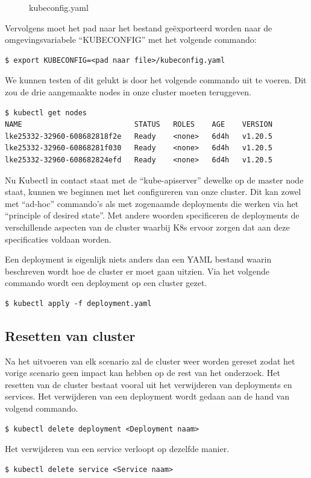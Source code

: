 \begin{figure}[h] 
	\inputminted[fontsize=\footnotesize,linenos]{yaml}{files/BachTest-kubeconfig.yaml}
	\caption{kubeconfig.yaml}
	\label{kubeconfig}
\end{figure}

Vervolgens moet het pad naar het bestand geëxporteerd worden naar de omgevingsvariabele ``KUBECONFIG'' met het volgende commando:
\begin{verbatim}
$ export KUBECONFIG=<pad naar file>/kubeconfig.yaml
\end{verbatim}

We kunnen testen of dit gelukt is door het volgende commando uit te voeren. Dit zou de drie aangemaakte nodes in onze cluster moeten teruggeven.
\begin{verbatim}
$ kubectl get nodes
NAME                          STATUS   ROLES    AGE    VERSION
lke25332-32960-608682818f2e   Ready    <none>   6d4h   v1.20.5
lke25332-32960-60868281f030   Ready    <none>   6d4h   v1.20.5
lke25332-32960-608682824efd   Ready    <none>   6d4h   v1.20.5
\end{verbatim}

Nu Kubectl in contact staat met de ``kube-apiserver'' dewelke op de master node staat, kunnen we beginnen met het configureren van onze cluster. Dit kan zowel met ``ad-hoc'' commando's als met zogenaamde deployments die werken via het ``principle of desired state''. Met andere woorden specificeren de deployments de verschillende  aspecten van de cluster waarbij K8s ervoor zorgen dat aan deze specificaties voldaan worden.

Een deployment is eigenlijk niets anders dan een YAML bestand waarin beschreven wordt hoe de cluster er moet gaan uitzien. Via het volgende commando wordt een deployment op een cluster gezet.
\begin{verbatim}
$ kubectl apply -f deployment.yaml
\end{verbatim}

\subsection{Resetten van cluster}
Na het uitvoeren van elk scenario zal de cluster weer worden gereset zodat het vorige scenario geen impact kan hebben op de rest van het onderzoek. Het resetten van de cluster bestaat vooral uit het verwijderen van deployments en services. Het verwijderen van een deployment wordt gedaan aan de hand van volgend commando.
\begin{verbatim}
$ kubectl delete deployment <Deployment naam>
\end{verbatim}
Het verwijderen van een service verloopt op dezelfde manier.
\begin{verbatim}
$ kubectl delete service <Service naam>
\end{verbatim}
	
